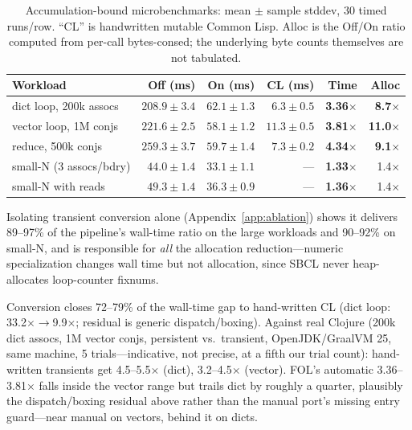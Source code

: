 \documentclass[sigplan,review,anonymous]{acmart}
\begin{document}
\begin{table}[h]
  \caption{Accumulation-bound microbenchmarks: mean $\pm$ sample stddev, 30 timed runs/row. ``CL'' is handwritten mutable Common Lisp. Alloc is the Off/On ratio computed from per-call bytes-consed; the underlying byte counts themselves are not tabulated.}
  \label{tab:microbenchmarks}
  \footnotesize
  \setlength{\tabcolsep}{2.5pt}
  \begin{tabular}{@{}lrrrrr@{}}
    \toprule
    Workload & Off (ms) & On (ms) & CL (ms) & Time & Alloc \\
    \midrule
    dict loop, 200k assocs  & $208.9\pm3.4$ & $62.1\pm1.3$ & $6.3\pm0.5$ & \textbf{3.36$\times$} & \textbf{8.7$\times$} \\
    vector loop, 1M conjs   & $221.6\pm2.5$ & $58.1\pm1.2$ & $11.3\pm0.5$ & \textbf{3.81$\times$} & \textbf{11.0$\times$} \\
    reduce, 500k conjs      & $259.3\pm3.7$ & $59.7\pm1.4$ & $7.3\pm0.2$ & \textbf{4.34$\times$} & \textbf{9.1$\times$} \\
    small-N (3 assocs/bdry) & $44.0\pm1.4$  & $33.1\pm1.1$ & ---         & \textbf{1.33$\times$} & 1.4$\times$ \\
    small-N with reads      & $49.3\pm1.4$  & $36.3\pm0.9$ & ---         & \textbf{1.36$\times$} & 1.4$\times$ \\
  \bottomrule
\end{tabular}
\end{table}

Isolating transient conversion alone (Appendix~\ref{app:ablation}) shows it delivers 89--97\% of the pipeline's wall-time ratio on the large workloads and 90--92\% on small-N, and is responsible for \emph{all} the allocation reduction---numeric specialization changes wall time but not allocation, since SBCL never heap-allocates loop-counter fixnums.

Conversion closes 72--79\% of the wall-time gap to hand-written CL (dict loop: 33.2$\times\to$9.9$\times$; residual is generic dispatch/boxing). Against real Clojure (200k dict assocs, 1M vector conjs, persistent vs.\ transient, OpenJDK/GraalVM 25, same machine, 5 trials---indicative, not precise, at a fifth our trial count): hand-written transients get 4.5--5.5$\times$ (dict), 3.2--4.5$\times$ (vector). FOL's automatic 3.36--3.81$\times$ falls inside the vector range but trails dict by roughly a quarter, plausibly the dispatch/boxing residual above rather than the manual port's missing entry guard---near manual on vectors, behind it on dicts.
\end{document}
